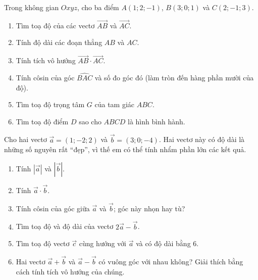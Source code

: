 \begin{bai}Trong không gian $Oxyz$, cho ba điểm $A(1;2;-1)$, $B(3;0;1)$ và $C(2;-1;3)$.
\begin{enumerate}[label=\alph*)]
\item Tìm toạ độ của các vectơ $\overrightarrow{AB}$ và $\overrightarrow{AC}$.
\item Tính độ dài các đoạn thẳng $AB$ và $AC$.
\item Tính tích vô hướng $\overrightarrow{AB}\cdot\overrightarrow{AC}$.
\item Tính côsin của góc $\widehat{BAC}$ và số đo góc đó (làm tròn đến hàng phần mười của độ).
\item Tìm toạ độ trọng tâm $G$ của tam giác $ABC$.
\item Tìm toạ độ điểm $D$ sao cho $ABCD$ là hình bình hành.
\end{enumerate}
\end{bai}

\begin{bai}Cho hai vectơ $\vec a=(1;-2;2)$ và $\vec b=(3;0;-4)$. Hai vectơ này có độ dài là những số nguyên rất “đẹp”, vì thế em có thể tính nhẩm phần lớn các kết quả.
\begin{enumerate}[label=\alph*)]
\item Tính $|\vec a|$ và $|\vec b|$.
\item Tính $\vec a\cdot\vec b$.
\item Tính côsin của góc giữa $\vec a$ và $\vec b$; góc này nhọn hay tù?
\item Tìm toạ độ và độ dài của vectơ $2\vec a-\vec b$.
\item Tìm toạ độ vectơ $\vec c$ cùng hướng với $\vec a$ và có độ dài bằng $6$.
\item Hai vectơ $\vec a+\vec b$ và $\vec a-\vec b$ có vuông góc với nhau không? Giải thích bằng cách tính tích vô hướng của chúng.
\end{enumerate}
\end{bai}

